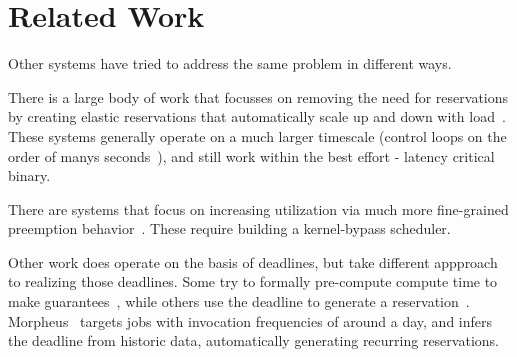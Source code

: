 \section{Related Work}

Other systems have tried to address the same problem in different ways. 

There is a large body of work that focusses on removing the need for
reservations by creating elastic reservations that automatically scale up and
down with load~\cite*{kubernetes, snowflake}. These systems generally
operate on a much larger timescale (control loops on the order of manys
seconds~\cite{kubernetestime}), and still work within the best effort
- latency critical binary. 

There are systems that focus on increasing utilization via much more
fine-grained preemption behavior~\cite*{caladan, shinjuku}. These require
building a kernel-bypass scheduler. 

Other work does operate on the basis of deadlines, but take different appproach
to realizing those deadlines. Some try to formally pre-compute compute time to
make guarantees~\cite{jockey}, while others use the deadline to generate a
reservation~\cite*{rayon}. Morpheus~\cite*{morpheus} targets jobs with
invocation frequencies of around a day, and infers the deadline from historic
data, automatically generating recurring reservations.

